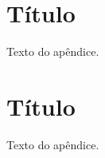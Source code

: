 \documentclass[
    12pt,               %
    openright,          %
    oneside,            %
    a4paper,            %
    english,            %
    french,             %
    spanish,            %
    brazil              %
    ]{abntex2}
\begin{document}

\begin{apendicesenv}

\partapendices

\chapter{Título}

Texto do apêndice.

\chapter{Título}

Texto do apêndice.

\end{apendicesenv}


\end{document}
